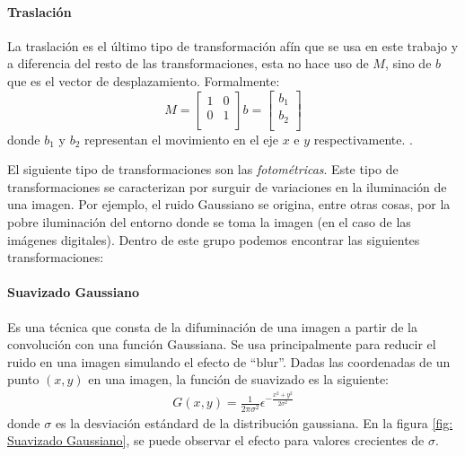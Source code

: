 		\paragraph{Traslación}		
			
			La traslación es el último tipo de transformación afín que se usa en este trabajo y a diferencia del resto de las transformaciones, esta no hace uso de $M$, sino de $b$ que es el vector de desplazamiento. Formalmente:
			\begin{equation*}
				M =  
					\begin{bmatrix}
						1 & 0 \\
						0 & 1  \\
					\end{bmatrix}
					b =
					\begin{bmatrix}
						b_1 \\
						b_2 \\
					\end{bmatrix}	
			\end{equation*}
		donde $b_1$ y $b_2$ representan el movimiento en el eje $x$ e $y$ respectivamente. .
		
	El siguiente tipo de transformaciones son las \textit{fotométricas}. Este tipo de transformaciones se caracterizan por surguir de variaciones en la iluminación de una imagen. Por ejemplo, el ruido Gaussiano se origina, entre otras cosas, por la pobre iluminación del entorno donde se toma la imagen (en el caso de las imágenes digitales). Dentro de este grupo podemos encontrar las siguientes transformaciones:
		
		\paragraph{Suavizado Gaussiano}
		
			Es una técnica que consta de la difuminación de una imagen a partir de la convolución con una función Gaussiana. Se usa principalmente para reducir el ruido en una imagen simulando el efecto de ``blur''. Dadas las coordenadas de un punto $(x, y)$ en una imagen, la función de suavizado es la siguiente:
			\begin{align*}
				G(x,y) = \frac{1}{2\pi\sigma^2}\epsilon^{-\frac{x^2+y^2}{2\sigma^2}}
			\end{align*}
			donde $\sigma$ es la desviación estándard de la distribución gaussiana. En la figura \ref{fig: Suavizado Gaussiano}, se puede observar el efecto para valores crecientes de $\sigma$.
			
